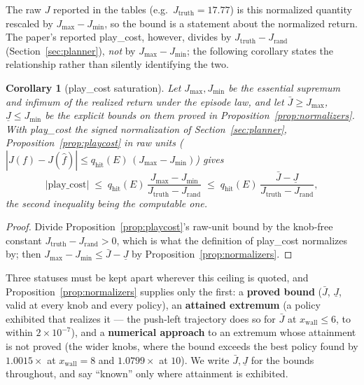 \documentclass[11pt]{article}
\newtheorem{corollary}{Corollary}
\theoremstyle{definition}
\theoremstyle{remark}
\begin{document}
The raw $J$ reported in the tables (e.g.\ $J_\mathrm{truth} = 17.77$) is this normalized quantity rescaled by $J_{\max} - J_{\min}$, so the bound is a statement about the normalized return. The paper's reported play\_cost, however, divides by $J_{\mathrm{truth}} - J_{\mathrm{rand}}$ (Section~\ref{sec:planner}), \emph{not} by $J_{\max} - J_{\min}$; the following corollary states the relationship rather than silently identifying the two.

\begin{corollary}[play\_cost saturation]
\label{cor:playcost}
Let $J_{\max}, J_{\min}$ be the essential supremum and infimum of the \emph{realized} return under the episode law, and let $\bar J \geq J_{\max}$, $\underline J \leq J_{\min}$ be the explicit \emph{bounds} on them proved in Proposition~\ref{prop:normalizers}. With play\_cost the signed normalization of Section~\ref{sec:planner}, Proposition~\ref{prop:playcost} in raw units ($|J(f) - J(\hat f)| \leq q_{\mathrm{hit}}(E)\,(J_{\max} - J_{\min})$) gives
\[
  |\mathrm{play\_cost}| \;\leq\; q_{\mathrm{hit}}(E)\,\frac{J_{\max} - J_{\min}}{J_{\mathrm{truth}} - J_{\mathrm{rand}}}
  \;\leq\; q_{\mathrm{hit}}(E)\,\frac{\bar J - \underline J}{J_{\mathrm{truth}} - J_{\mathrm{rand}}},
\]
the second inequality being the computable one.
\end{corollary}

\begin{proof}
Divide Proposition~\ref{prop:playcost}'s raw-unit bound by the knob-free constant $J_{\mathrm{truth}} - J_{\mathrm{rand}} > 0$, which is what the definition of play\_cost normalizes by; then $J_{\max} - J_{\min} \leq \bar J - \underline J$ by Proposition~\ref{prop:normalizers}.
\end{proof}

Three statuses must be kept apart wherever this ceiling is quoted, and Proposition~\ref{prop:normalizers} supplies only the first: a \textbf{proved bound} ($\bar J$, $\underline J$, valid at every knob and every policy), an \textbf{attained extremum} (a policy exhibited that realizes it --- the push-left trajectory does so for $\bar J$ at $x_\mathrm{wall} \leq 6$, to within $2\times10^{-7}$), and a \textbf{numerical approach} to an extremum whose attainment is not proved (the wider knobs, where the bound exceeds the best policy found by $1.0015\times$ at $x_\mathrm{wall} = 8$ and $1.0799\times$ at $10$). We write $\bar J, \underline J$ for the bounds throughout, and say ``known'' only where attainment is exhibited.
\end{document}
